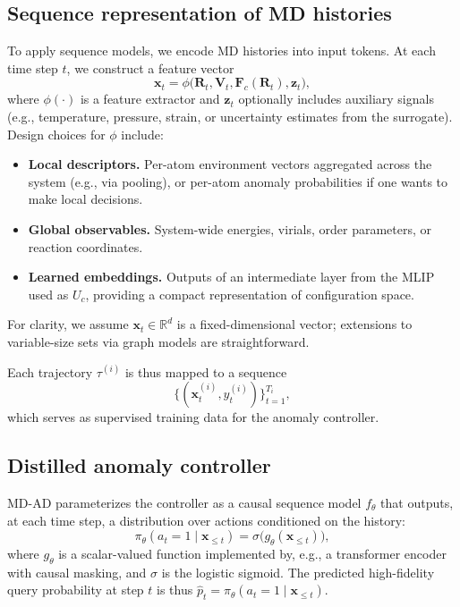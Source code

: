 \documentclass{article}
\begin{document}
\subsection{Sequence representation of MD histories}

To apply sequence models, we encode MD histories into input tokens. At each time step $t$, we construct a feature vector
\begin{equation}
    \mathbf{x}_t = \phi\big(\mathbf{R}_t, \mathbf{V}_t, \mathbf{F}_c(\mathbf{R}_t), \mathbf{z}_t\big),
\end{equation}
where $\phi(\cdot)$ is a feature extractor and $\mathbf{z}_t$ optionally includes auxiliary signals (e.g., temperature, pressure, strain, or uncertainty estimates from the surrogate). Design choices for $\phi$ include:
\begin{itemize}
    \item \textbf{Local descriptors.} Per-atom environment vectors aggregated across the system (e.g., via pooling), or per-atom anomaly probabilities if one wants to make local decisions.
    \item \textbf{Global observables.} System-wide energies, virials, order parameters, or reaction coordinates.
    \item \textbf{Learned embeddings.} Outputs of an intermediate layer from the MLIP used as $U_c$, providing a compact representation of configuration space.
\end{itemize}
For clarity, we assume $\mathbf{x}_t \in \mathbb{R}^d$ is a fixed-dimensional vector; extensions to variable-size sets via graph models are straightforward.

Each trajectory $\tau^{(i)}$ is thus mapped to a sequence
\begin{equation}
    \big\{ (\mathbf{x}^{(i)}_t, y^{(i)}_t) \big\}_{t=1}^{T_i},
\end{equation}
which serves as supervised training data for the anomaly controller.

\subsection{Distilled anomaly controller}

MD-AD parameterizes the controller as a causal sequence model $f_\theta$ that outputs, at each time step, a distribution over actions conditioned on the history:
\begin{equation}
    \pi_\theta(a_t = 1 \mid \mathbf{x}_{\le t}) = \sigma\big( g_\theta(\mathbf{x}_{\le t}) \big),
\end{equation}
where $g_\theta$ is a scalar-valued function implemented by, e.g., a transformer encoder with causal masking, and $\sigma$ is the logistic sigmoid. The predicted high-fidelity query probability at step $t$ is thus $\hat{p}_t = \pi_\theta(a_t = 1 \mid \mathbf{x}_{\le t})$.
\end{document}
